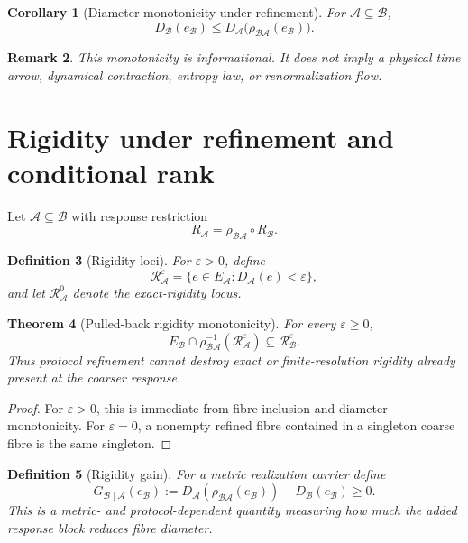 \documentclass[11pt]{article}
\newtheorem{definition}{Definition}[section]
\newtheorem{theorem}[definition]{Theorem}
\newtheorem{corollary}[definition]{Corollary}
\newtheorem{remark}[definition]{Remark}
\newcommand{\Acal}{\mathcal A}
\newcommand{\Bcal}{\mathcal B}
\begin{document}
\begin{corollary}[Diameter monotonicity under refinement]
For \(\Acal\subseteq\Bcal\),
\[
D_{\Bcal}(e_{\Bcal})
\le
D_{\Acal}\bigl(\rho_{\Bcal\Acal}(e_{\Bcal})\bigr).
\]
\end{corollary}

\begin{remark}
This monotonicity is informational. It does not imply a physical time arrow,
dynamical contraction, entropy law, or renormalization flow.
\end{remark}

\section{Rigidity under refinement and conditional rank}

Let \(\Acal\subseteq\Bcal\) with response restriction
\[
R_{\Acal}=\rho_{\Bcal\Acal}\circ R_{\Bcal}.
\]

\begin{definition}[Rigidity loci]
For \(\varepsilon>0\), define
\[
\mathcal R_{\Acal}^{\varepsilon}
=
\{e\in E_{\Acal}:D_{\Acal}(e)<\varepsilon\},
\]
and let \(\mathcal R_{\Acal}^{0}\) denote the exact-rigidity locus.
\end{definition}

\begin{theorem}[Pulled-back rigidity monotonicity]
\label{thm:rigidity-pullback}
For every \(\varepsilon\ge0\),
\[
E_{\Bcal}\cap
\rho_{\Bcal\Acal}^{-1}
(\mathcal R_{\Acal}^{\varepsilon})
\subseteq
\mathcal R_{\Bcal}^{\varepsilon}.
\]
Thus protocol refinement cannot destroy exact or finite-resolution rigidity
already present at the coarser response.
\end{theorem}

\begin{proof}
For \(\varepsilon>0\), this is immediate from fibre inclusion and diameter
monotonicity. For \(\varepsilon=0\), a nonempty refined fibre contained in
a singleton coarse fibre is the same singleton.
\end{proof}

\begin{definition}[Rigidity gain]
For a metric realization carrier define
\[
G_{\Bcal\mid\Acal}(e_{\Bcal})
:=
D_{\Acal}(\rho_{\Bcal\Acal}(e_{\Bcal}))
-D_{\Bcal}(e_{\Bcal})
\ge0.
\]
This is a metric- and protocol-dependent quantity measuring how much the
added response block reduces fibre diameter.
\end{definition}
\end{document}
